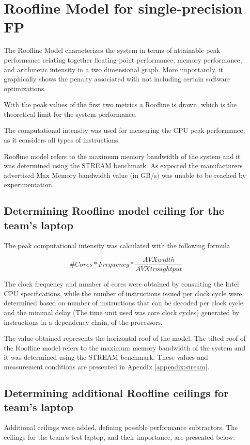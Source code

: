 \documentclass{sigplanconf}
\begin{document}
\section{Roofline Model for single-precision FP}
The Roofline Model characterizes the system in terms of attainable peak performance relating together floating-point performance, memory performance, and arithmetic intensity in a two dimensional graph. More importantly, it graphically shows the penalty associated with not including certain software optimizations.\par 
With the peak values of the first two metrics a Roofline is drawn, which
is the theoretical limit for the system performance. \par 
The computational intensity was used for measuring the CPU peak
performance, as it considers all types of instructions.\par
Roofline model refers to the maximum memory bandwidth of the system and it was determined using the STREAM benchmark\cite{stream}. As expected the manufacturers advertised Max Memory bandwidth value (in GB/s) was unable to be reached by experimentation.\par 

\subsection{Determining Roofline model ceiling for the team's laptop} 
The peak computational intensity was calculated with the following formula

\[ \#Cores * Frequency * \frac{AVX width}{AVX    troughtput}  \]

The clock frequency and
number of cores were obtained by consulting the Intel\cite{intel_5650}\cite{intel_i7} CPU specifications, while the number of
instructions issued per clock cycle were determined based on number of instructions that can be decoded per clock cycle\cite{intel_intrinsics} and the minimal delay (The time unit used was core clock cycles) generated by instructions in a dependency chain\cite{agner}, of the processors. 
\par 
The value obtained represents the horizontal roof of the model. The tilted roof of the
Roofline model refers to the maximum memory bandwidth of the system and it was determined
using the STREAM benchmark\cite{stream}. These values and measurement conditions are presented in Apendix \ref{appendix:stream}.

\subsection{Determining additional Roofline ceilings for team's laptop} 
Additional ceilings were added, defining possible performance subtractors. The ceilings for the team's test laptop, and their importance, are presented below:
\end{document}
